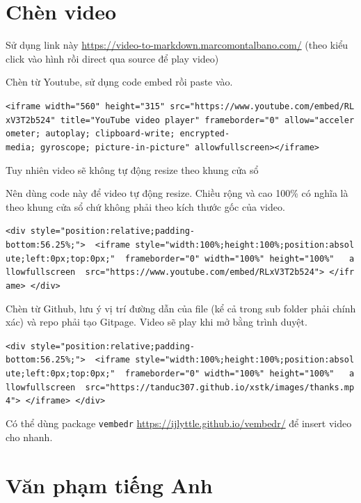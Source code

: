 \documentclass[
]{book}
\theoremstyle{definition}
\theoremstyle{definition}
\theoremstyle{definition}
\theoremstyle{definition}
\theoremstyle{remark}
\begin{document}
\hypertarget{chuxe8n-video}{%
\section{Chèn video}\label{chuxe8n-video}}

Sử dụng link này \url{https://video-to-markdown.marcomontalbano.com/} (theo kiểu click vào hình rồi direct qua source để play video)

Chèn từ Youtube, sử dụng code embed rồi paste vào.

\texttt{\textless{}iframe\ width="560"\ height="315"\ src="https://www.youtube.com/embed/RLxV3T2b524"\ title="YouTube\ video\ player"\ frameborder="0"\ allow="accelerometer;\ autoplay;\ clipboard-write;\ encrypted-media;\ gyroscope;\ picture-in-picture"\ allowfullscreen\textgreater{}\textless{}/iframe\textgreater{}}

Tuy nhiên video sẽ không tự động resize theo khung cửa sổ

Nên dùng code này để video tự động resize. Chiều rộng và cao 100\% có nghĩa là theo khung cửa sổ chứ không phải theo kích thước gốc của video.

\texttt{\textless{}div\ style="position:relative;padding-bottom:56.25\%;"\textgreater{}\ \ \textless{}iframe\ style="width:100\%;height:100\%;position:absolute;left:0px;top:0px;"\ \ frameborder="0"\ width="100\%"\ height="100\%"\ \ \ allowfullscreen\ \ src="https://www.youtube.com/embed/RLxV3T2b524"\textgreater{}\ \textless{}/iframe\textgreater{}\ \textless{}/div\textgreater{}}

Chèn từ Github, lưu ý vị trí đường dẫn của file (kể cả trong sub folder phải chính xác) và repo phải tạo Gitpage. Video sẽ play khi mở bằng trình duyệt.

\texttt{\textless{}div\ style="position:relative;padding-bottom:56.25\%;"\textgreater{}\ \ \textless{}iframe\ style="width:100\%;height:100\%;position:absolute;left:0px;top:0px;"\ \ frameborder="0"\ width="100\%"\ height="100\%"\ \ \ allowfullscreen\ \ src="https://tanduc307.github.io/xstk/images/thanks.mp4"\textgreater{}\ \textless{}/iframe\textgreater{}\ \textless{}/div\textgreater{}}

Có thể dùng package \texttt{vembedr} \url{https://ijlyttle.github.io/vembedr/} để insert video cho nhanh.

\hypertarget{vux103n-phux1ea1m-tiux1ebfng-anh}{%
\section{Văn phạm tiếng Anh}\label{vux103n-phux1ea1m-tiux1ebfng-anh}}
\end{document}
